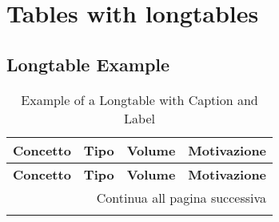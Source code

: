 \chapter{Tables with longtables}

\section{Longtable Example}
\begin{longtable}{|l|c|c|p{6.2cm}|}
    \caption{Example of a Longtable with Caption and Label}
    \label{tab:longtable_example}\\
    \hline \textbf{Concetto} & \textbf{Tipo} & \textbf{Volume} & \textbf{Motivazione}\\\hline
    \endfirsthead

    \hline \textbf{Concetto} & \textbf{Tipo} & \textbf{Volume} & \textbf{Motivazione}\\\hline
    \endhead

    \hline \multicolumn{4}{|r|}{{Continua all pagina successiva}}\\\hline
    \endfoot


\end{longtable}
